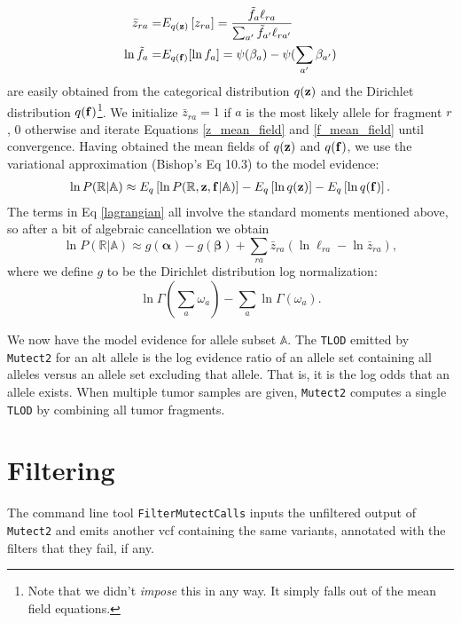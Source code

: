 \documentclass[nofootinbib,amssymb,amsmath]{revtex4}
\newcommand{\vf}{{\bf f}}
\newcommand{\vz}{{\bf z}}
\newcommand{\valpha}{{\bm{\alpha}}}
\newcommand{\vbeta}{{\bm{\beta}}}
\newcommand{\code}[1]{\texttt{#1}}
\begin{document}
\begin{align}
\bar{z}_{ra} =& E_{q(\vz)} \left[ z_{ra} \right] = \frac{\tilde{f}_a \ell_{ra}}{\sum_{a^\prime} \tilde{f}_{a^\prime} \ell_{ra^\prime}} \label{z-bar} \\
\ln \tilde{f}_a =& E_{q(\vf)}[\ln f_a] = \psi(\beta_a) - \psi(\sum_{a^\prime} \beta_{a^\prime})
\label{f-tilde}
\end{align}
are easily obtained from the categorical distribution $q(\vz)$ and the Dirichlet distribution $q(\vf)$\footnote{Note that we didn't \textit{impose} this in any way.  It simply falls out of the mean field equations.}.  We initialize $\bar{z}_{ra} = 1$ if $a$ is the most likely allele for fragment $r$, 0 otherwise and iterate Equations \ref{z_mean_field} and \ref{f_mean_field} until convergence. Having obtained the mean fields of $q(\vz)$ and $q(\vf)$, we use the variational approximation (Bishop's Eq 10.3) to the model evidence:
\begin{align}
\ln P(\mathbb{R} | \mathbb{A}) \approx  E_q \left[ \ln P(\mathbb{R}, \vz, \vf | \mathbb{A}) \right] - E_q \left[ \ln q(\vz) \right] - E_q \left[ \ln q(\vf) \right]. \label{lagrangian}
\end{align}
The terms in Eq \ref{lagrangian} all involve the standard moments mentioned above, so after a bit of algebraic cancellation we obtain
\begin{equation}
\ln P(\mathbb{R} | \mathbb{A}) \approx g(\valpha) - g(\vbeta) +  \sum_{ra} \bar{z}_{ra} \left( \ln \ell_{ra} - \ln \bar{z}_{ra} \right),
\label{tumor-lod}
\end{equation}
where we define $g$ to be the Dirichlet distribution log normalization:
\begin{equation}
\ln \Gamma(\sum_a \omega_a) - \sum_a \ln \Gamma(\omega_a).
\end{equation}

We now have the model evidence for allele subset $\mathbb{A}$. The \code{TLOD} emitted by \code{Mutect2} for an alt allele is the log evidence ratio of an allele set containing all alleles versus an allele set excluding that allele.  That is, it is the log odds that an allele exists.  When multiple tumor samples are given, \code{Mutect2} computes a single \code{TLOD} by combining all tumor fragments.

\section{Filtering}
The command line tool \code{FilterMutectCalls} inputs the unfiltered output of \code{Mutect2} and emits another vcf containing the same variants, annotated with the filters that they fail, if any.
\end{document}
